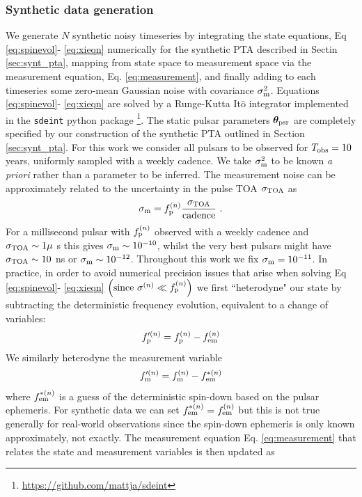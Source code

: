\documentclass[fleqn,usenatbib,useAMS]{mnras}
\begin{document}
\subsubsection{Synthetic data generation}
We generate $N$ synthetic noisy timeseries by integrating the state equations, Eq \ref{eq:spinevol}- \ref{eq:xieqn} numerically for the synthetic PTA described in Sectin \ref{sec:synt_pta}, mapping from state space to measurement space via the measurement equation, Eq. \ref{eq:measurement}, and finally adding to each timeseries some zero-mean Gaussian noise with covariance $\sigma_{\rm m}^2$. Equations \ref{eq:spinevol}- \ref{eq:xieqn} are solved by a Runge-Kutta It$\hat{\text{o}}$ integrator implemented in the \texttt{sdeint} python package \footnote{\url{https://github.com/mattja/sdeint}}. The static pulsar parameters  $\boldsymbol{\theta}_{\rm psr}$ are completely specified by our construction of the synthetic PTA outlined in Section \ref{sec:synt_pta}. For this work we consider all pulsars to be observed for $T_{\rm obs} =10$ years, uniformly sampled with a weekly cadence. We take $\sigma_{\rm m}^2$ to be known \textit{a priori} rather than a parameter to be inferred. The measurement noise can be approximately related to the uncertainty in the pulse TOA $\sigma_{\rm TOA}$ as
\begin{equation}
	\sigma_{\rm m} = f_{\rm p}^{(n)} \frac{\sigma_{\rm TOA}}{\text{cadence}} \ . 
\end{equation}
For a millisecond pulsar with $f_{\rm p}^{(n)}$ observed with a weekly cadence and $\sigma_{\rm TOA} \sim 1 \mu$ s this gives $\sigma_{\rm m} \sim 10^{-10}$, whilst the very best pulsars might have $\sigma_{\rm TOA} \sim 10 $ ns or $\sigma_{\rm m} \sim 10^{-12}$. Throughout this work we fix $\sigma_{\rm m} = 10^{-11}$. In practice, in order to avoid numerical precision issues that arise when solving Eq \ref{eq:spinevol}- \ref{eq:xieqn} $\left ( \text{since } \sigma^{(n)} \ll f_{\rm p}^{(n)} \right)$ we first ``heterodyne" our state by subtracting the deterministic frequency evolution, equivalent to a change of variables:
\begin{equation}
	f_{\rm p}^{\prime (n)} = f_{\rm p}^{(n)} - f_{\rm em}^{(n)}
\end{equation}  
We similarly heterodyne the measurement variable 
\begin{equation}
	f_{\rm m}^{\prime (n)} = f_{\rm m}^{(n)} - f_{\rm em}^{*(n)}
\end{equation}
where $ f_{\rm em}^{*(n)}$ is a guess of the deterministic spin-down based on the pulsar ephemeris. For synthetic data we can set $ f_{\rm em}^{*(n)} = f_{\rm em}^{(n)}$ but this is not true generally for real-world observations since the spin-down ephemeris is only known approximately, not exactly. The measurement equation Eq. \ref{eq:measurement} that relates the state and measurement variables is then updated as 
\end{document}
